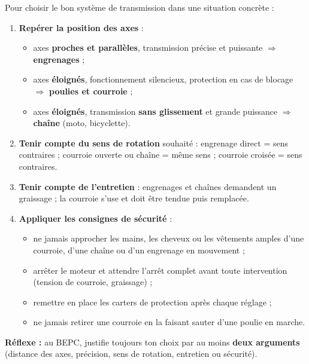 \documentclass[11pt]{article}
\newcommand{\cle}[1]{{\popxbold\color{popdark}#1}}
\begin{document}
\begin{methode}
Pour choisir le bon système de transmission dans une situation concrète :
\begin{enumerate}
\item \textbf{Repérer la position des axes} :
\begin{itemize}
\item axes \textbf{proches et parallèles}, transmission précise et puissante $\Rightarrow$ \textbf{engrenages} ;
\item axes \textbf{éloignés}, fonctionnement silencieux, protection en cas de blocage $\Rightarrow$ \textbf{poulies et courroie} ;
\item axes \textbf{éloignés}, transmission \textbf{sans glissement} et grande puissance $\Rightarrow$ \textbf{chaîne} (moto, bicyclette).
\end{itemize}
\item \textbf{Tenir compte du sens de rotation} souhaité : engrenage direct = sens contraires ; courroie ouverte ou chaîne = même sens ; courroie croisée = sens contraires.
\item \textbf{Tenir compte de l'entretien} : engrenages et chaînes demandent un graissage ; la courroie s'use et doit être tendue puis remplacée.
\item \textbf{Appliquer les consignes de sécurité} :
\begin{itemize}
\item ne jamais approcher les mains, les cheveux ou les vêtements amples d'une courroie, d'une chaîne ou d'un engrenage en mouvement ;
\item arrêter le moteur et attendre l'arrêt complet avant toute intervention (tension de courroie, graissage) ;
\item remettre en place les \cle{carters de protection} après chaque réglage ;
\item ne jamais retirer une courroie en la faisant sauter d'une poulie en marche.
\end{itemize}
\end{enumerate}
\textbf{Réflexe :} au BEPC, justifie toujours ton choix par au moins \textbf{deux arguments} (distance des axes, précision, sens de rotation, entretien ou sécurité).
\end{methode}
\end{document}
